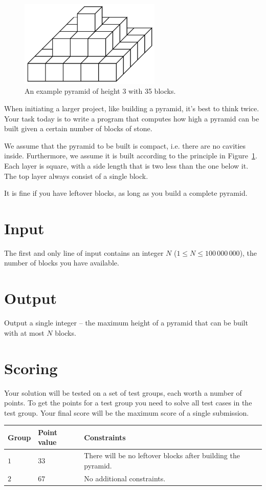 
\begin{figure}[h!]
\centering
    \includegraphics[width=0.6\textwidth]{pyramid.png}
\caption{An example pyramid of height 3 with 35 blocks.}
\label{fig:pyramid}
\end{figure}

When initiating a larger project, like building a pyramid, it's best to think twice.
Your task today is to write a program that computes how high a pyramid can be built given a certain number of blocks of stone.

We assume that the pyramid to be built is compact, i.e. there are no cavities inside.
Furthermore, we assume it is built according to the principle in Figure~\ref{fig:pyramid}.
Each layer is square, with a side length that is two less than the one below it.
The top layer always consist of a single block.

It is fine if you have leftover blocks, as long as you build a complete pyramid.

\section*{Input}
The first and only line of input contains an integer $N$ ($1 \le N \le 100\,000\,000$), the number of blocks you have available.

\section*{Output}
Output a single integer -- the maximum height of a pyramid that can be built with at most $N$ blocks.

\section*{Scoring}
Your solution will be tested on a set of test groups, each worth a number of points.
To get the points for a test group you need to solve all test cases in the test group. Your final score will be the maximum score of a single submission.


\noindent
\begin{tabular}{| l | l | p{12cm} |}
  \hline
  \textbf{Group} & \textbf{Point value} & \textbf{Constraints} \\ \hline
  $1$    & $33$        & There will be no leftover blocks after building the pyramid. \\ \hline
  $2$    & $67$        & No additional constraints. \\ \hline
\end{tabular}
